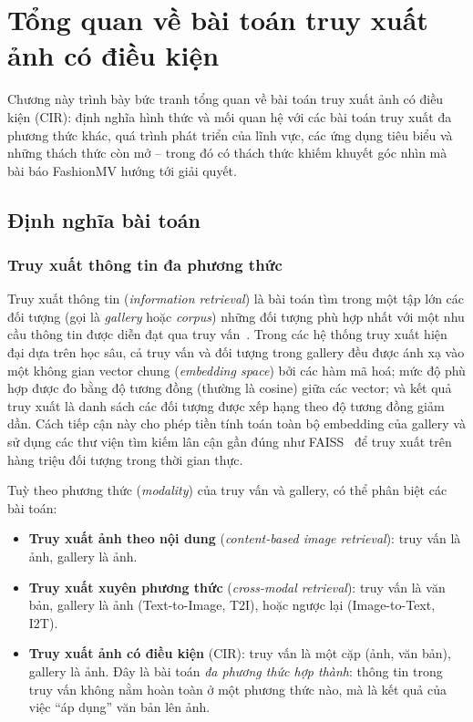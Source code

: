 \chapter{Tổng quan về bài toán truy xuất ảnh có điều kiện}\label{chapter:overview}
\pagestyle{fancy}

Chương này trình bày bức tranh tổng quan về bài toán truy xuất ảnh có điều kiện (CIR): định nghĩa hình thức và mối quan hệ với các bài toán truy xuất đa phương thức khác, quá trình phát triển của lĩnh vực, các ứng dụng tiêu biểu và những thách thức còn mở -- trong đó có thách thức khiếm khuyết góc nhìn mà bài báo FashionMV hướng tới giải quyết.

\section{Định nghĩa bài toán}\label{sec:problem-definition}

\subsection{Truy xuất thông tin đa phương thức}

Truy xuất thông tin (\emph{information retrieval}) là bài toán tìm trong một tập lớn các đối tượng (gọi là \emph{gallery} hoặc \emph{corpus}) những đối tượng phù hợp nhất với một nhu cầu thông tin được diễn đạt qua truy vấn~\cite{manning2008ir}. Trong các hệ thống truy xuất hiện đại dựa trên học sâu, cả truy vấn và đối tượng trong gallery đều được ánh xạ vào một không gian vector chung (\emph{embedding space}) bởi các hàm mã hoá; mức độ phù hợp được đo bằng độ tương đồng (thường là cosine) giữa các vector; và kết quả truy xuất là danh sách các đối tượng được xếp hạng theo độ tương đồng giảm dần. Cách tiếp cận này cho phép tiền tính toán toàn bộ embedding của gallery và sử dụng các thư viện tìm kiếm lân cận gần đúng như FAISS~\cite{johnson2019faiss} để truy xuất trên hàng triệu đối tượng trong thời gian thực.

Tuỳ theo phương thức (\emph{modality}) của truy vấn và gallery, có thể phân biệt các bài toán:
\begin{itemize}
    \item \textbf{Truy xuất ảnh theo nội dung} (\emph{content-based image retrieval}): truy vấn là ảnh, gallery là ảnh.
    \item \textbf{Truy xuất xuyên phương thức} (\emph{cross-modal retrieval}): truy vấn là văn bản, gallery là ảnh (Text-to-Image, T2I), hoặc ngược lại (Image-to-Text, I2T).
    \item \textbf{Truy xuất ảnh có điều kiện} (CIR): truy vấn là một cặp (ảnh, văn bản), gallery là ảnh. Đây là bài toán \emph{đa phương thức hợp thành}: thông tin trong truy vấn không nằm hoàn toàn ở một phương thức nào, mà là kết quả của việc ``áp dụng'' văn bản lên ảnh.
\end{itemize}

